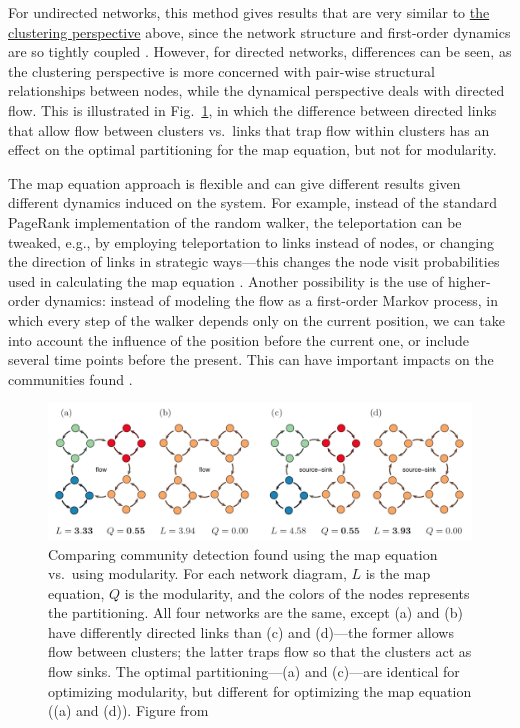 For undirected networks, this method gives results that are very similar
to \protect\hyperlink{clustering-perspective}{the clustering
perspective} above, since the network structure and first-order dynamics
are so tightly coupled \autocite{schaub_many_2017}. However, for
directed networks, differences can be seen, as the clustering
perspective is more concerned with pair-wise structural relationships
between nodes, while the dynamical perspective deals with directed flow.
This is illustrated in Fig.~\ref{fig:mapvsmod}, in which the difference
between directed links that allow flow between clusters vs.~links that
trap flow within clusters has an effect on the optimal partitioning for
the map equation, but not for modularity.

The map equation approach is flexible and can give different results
given different dynamics induced on the system. For example, instead of
the standard PageRank implementation of the random walker, the
teleportation can be tweaked, e.g., by employing teleportation to links
instead of nodes, or changing the direction of links in strategic
ways---this changes the node visit probabilities used in calculating the
map equation \autocite{lambiotte_ranking_2012}. Another possibility is
the use of higher-order dynamics: instead of modeling the flow as a
first-order Markov process, in which every step of the walker depends
only on the current position, we can take into account the influence of
the position before the current one, or include several time points
before the present. This can have important impacts on the communities
found \autocite{rosvall_memory_2014}.

\begin{figure}
\centering
\includegraphics{img/rosvall2010_fig3_mapvsmodularity.png}
\caption{Comparing community detection found using the map equation
vs.~using modularity. For each network diagram, \(L\) is the map
equation, \(Q\) is the modularity, and the colors of the nodes
represents the partitioning. All four networks are the same, except (a)
and (b) have differently directed links than (c) and (d)---the former
allows flow between clusters; the latter traps flow so that the clusters
act as flow sinks. The optimal partitioning---(a) and (c)---are
identical for optimizing modularity, but different for optimizing the
map equation ((a) and (d)). Figure from
\autocite{rosvall_map_2010}}\label{fig:mapvsmod}
\end{figure}

